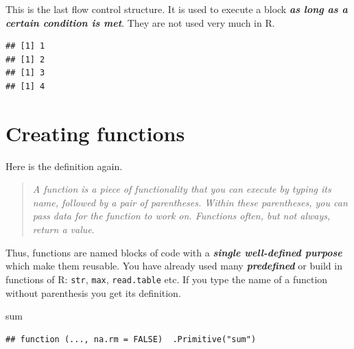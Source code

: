 \documentclass[]{book}
\newenvironment{Shaded}{\begin{snugshade}}{\end{snugshade}}
\newcommand{\ControlFlowTok}[1]{\textcolor[rgb]{0.13,0.29,0.53}{\textbf{#1}}}
\newcommand{\DecValTok}[1]{\textcolor[rgb]{0.00,0.00,0.81}{#1}}
\newcommand{\KeywordTok}[1]{\textcolor[rgb]{0.13,0.29,0.53}{\textbf{#1}}}
\newcommand{\NormalTok}[1]{#1}
\newcommand{\OperatorTok}[1]{\textcolor[rgb]{0.81,0.36,0.00}{\textbf{#1}}}
\newcommand{\StringTok}[1]{\textcolor[rgb]{0.31,0.60,0.02}{#1}}
\begin{document}
This is the last flow control structure. It is used to execute a block \textbf{\emph{as long as a certain condition is met}}. They are not used very much in R.

\begin{Shaded}
\end{Shaded}

\begin{verbatim}
## [1] 1
## [1] 2
## [1] 3
## [1] 4
\end{verbatim}

\hypertarget{creating-functions}{%
\section{Creating functions}\label{creating-functions}}

Here is the definition again.

\begin{quote}
\emph{A function is a piece of functionality that you can execute by typing its name, followed by a pair of parentheses. Within these parentheses, you can pass data for the function to work on. Functions often, but not always, return a value}.
\end{quote}

Thus, functions are named blocks of code with a \textbf{\emph{single well-defined purpose}} which make them reusable.
You have already used many \textbf{\emph{predefined}} or build in functions of R: \texttt{str}, \texttt{max}, \texttt{read.table} etc. If you type the name of a function without parenthesis you get its definition.

\begin{Shaded}
\begin{Highlighting}[]
\NormalTok{sum}
\end{Highlighting}
\end{Shaded}

\begin{verbatim}
## function (..., na.rm = FALSE)  .Primitive("sum")
\end{verbatim}
\end{document}

